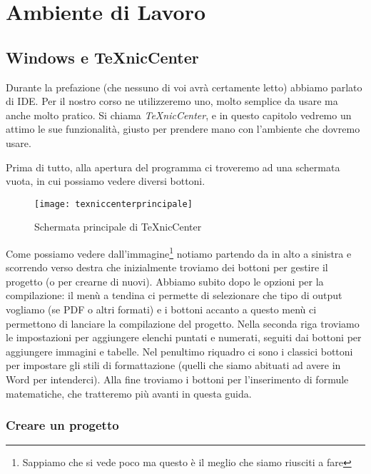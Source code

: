 \chapter{ Ambiente di Lavoro}

\section{Windows e TeXnicCenter}

Durante la prefazione (che nessuno di voi avrà certamente letto) abbiamo
parlato di IDE. Per il nostro corso ne utilizzeremo uno, molto semplice da
usare ma anche molto pratico. Si chiama \textit{TeXnicCenter}, e in questo
capitolo vedremo un attimo le sue funzionalità, giusto per prendere mano
con l'ambiente che dovremo usare.

Prima di tutto, alla apertura del programma ci troveremo ad una schermata
vuota, in cui possiamo vedere diversi bottoni.

\begin{figure}[H]
  \centering
  \texttt{[image: texniccenterprincipale]}
  \caption{Schermata principale di TeXnicCenter}
\end{figure}

Come possiamo vedere dall'immagine\footnote{Sappiamo che si vede poco
ma questo è il meglio che siamo riusciti a fare} notiamo partendo da in alto
a sinistra e scorrendo verso destra che inizialmente troviamo dei bottoni per
gestire il progetto (o per crearne di nuovi).
Abbiamo subito dopo le opzioni per la compilazione: il menù a tendina ci
permette di selezionare che tipo di output vogliamo (se PDF o altri formati) e
i bottoni accanto a questo menù ci permettono di lanciare la compilazione
del progetto.
Nella seconda riga troviamo le impostazioni per aggiungere elenchi puntati e
numerati, seguiti dai bottoni per aggiungere immagini e tabelle. Nel penultimo
riquadro ci sono i classici bottoni per impostare gli stili di formattazione
(quelli che siamo abituati ad avere in Word per intenderci).
Alla fine troviamo i bottoni per l'inserimento di formule matematiche, che
tratteremo più avanti in questa guida.

\subsection{Creare un progetto}

